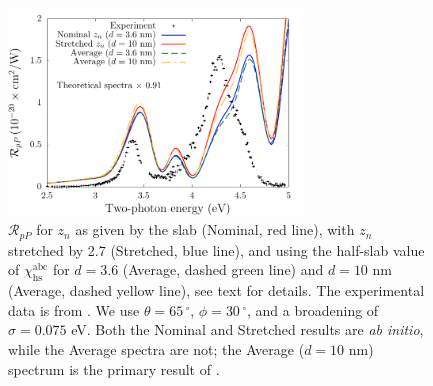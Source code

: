 \documentclass[utf8]{frontiersSCNS}
\begin{document}
\begin{figure}[b]
\centering 
\includegraphics[width=0.7\textwidth]{figures/fig4}
\caption{$\mathcal{R}_{pP}$ for $z_{n}$ as given by the slab (Nominal, red
line), with $z_{n}$ stretched by 2.7 (Stretched, blue line), and using the
half-slab value of $\chi^{\mathrm{abc}}_{\mathrm{hs}}$ for $d = 3.6$ (Average,
dashed green line) and $d = 10$ nm (Average, dashed yellow line), see text for
details. The experimental data is from \cite{mejiaPRB02}. We use $\theta =
65\,^{\circ}$, $\phi = 30\,^{\circ}$, and a broadening of $\sigma = 0.075$ eV.
Both the Nominal and Stretched results are \emph{ab initio}, while the Average
spectra are not; the Average ($d = 10$ nm) spectrum is the primary result of
\cite{andersonPRB16b}.}
\label{fig:rpp}
\end{figure}
\end{document}
